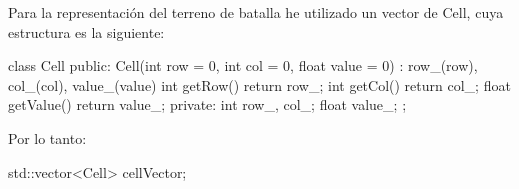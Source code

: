 Para la representación del terreno de batalla he utilizado un vector de Cell, cuya estructura es la siguiente:

class Cell {
    public:
        Cell(int row = 0, int col = 0, float value = 0) : row_(row), col_(col), value_(value) {}
        int getRow() { return row_; }
        int getCol() { return col_; }
        float getValue() { return value_; }
    private:
        int row_, col_;
        float value_;
};

Por lo tanto: 

std::vector<Cell> cellVector;